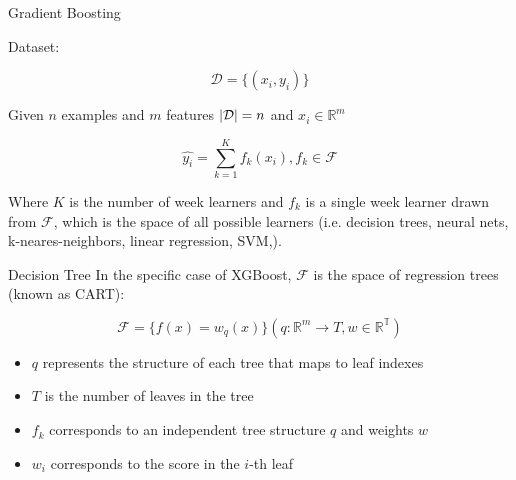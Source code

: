 \documentclass{beamer}
\DeclarePairedDelimiter\abs{\lvert}{\rvert}%
\begin{document}
\begin{frame}{Gradient Boosting}

Dataset:

\begin{equation*}
\mathcal{D} = \{(x_i, y_i)\}
\end{equation*}

Given $n$ examples and $m$ features $\abs{\mathcal{D}} = n$ and $x_i \in  \mathbb{R}^m$

\begin{equation}
	\hat{y_i} = \sum_{k=1}^{K} f_k(x_i), f_k \in \mathcal{F}
\end{equation}

Where $K$ is the number of week learners and $f_k$ is a single week learner drawn from $\mathcal{F}$, which is the space of all possible learners (i.e. decision trees, neural nets, k-neares-neighbors, linear regression, SVM,).
	
\end{frame}

\begin{frame}{Decision Tree}
In the specific case of XGBoost, $\mathcal{F}$ is the space of regression trees (known as CART):

\begin{equation*}
\mathcal{F} = \{f(x) = w_q(x)\}(q: \mathbb{R}^m \rightarrow T, w \in \mathbb{R^T})
\end{equation*}
\begin{itemize}
	\item $q$ represents the structure of each tree that maps to leaf indexes
	\item $T$ is the number of leaves in the tree
	\item $f_k$ corresponds to an independent tree structure $q$ and weights $w$
	\item $w_i$ corresponds to the score in the $i$-th leaf
\end{itemize}

\end{frame}
\end{document}
